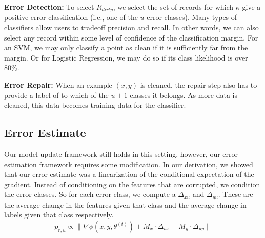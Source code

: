 \noindent\textbf{Error Detection: } To select $R_{dirty}$, we select the set of records for which $\kappa$ give a positive error classification (i.e., one of the $u$ error classes).
Many types of classifiers allow users to tradeoff precision and recall.
In other words, we can also select any record within some level of confidence of the classification margin.
For an SVM, we may only classify a point as clean if it is sufficiently far from the margin.
Or for Logistic Regression, we may do so if its class likelihood is over 80\%.

\vspace{0.5em}

\noindent\textbf{Error Repair: } When an example $(x,y)$ is cleaned, the repair step also has to provide a label of to which of the $u+1$ classes it belongs. As more data is cleaned, this data becomes training data for the classifier.

\subsection{Error Estimate}
Our model update framework still holds in this setting, however, our error estimation framework requires some modification.
In our derivation, we showed that our error estimate was a linearization of the conditional expectation of the gradient.
Instead of conditioning on the features that are corrupted, we condition the error classes.
So for each error class, we compute a $\Delta_{xu}$ and $\Delta_{yu}$.
These are the average change in the features given that class and the average change in labels given that class respectively.
\[
p_{r,u}\propto\|\nabla\phi(x,y,\theta^{(t)}) + M_x \cdot \Delta_{ux} +  M_y \cdot \Delta_{uy}\|
\] 

